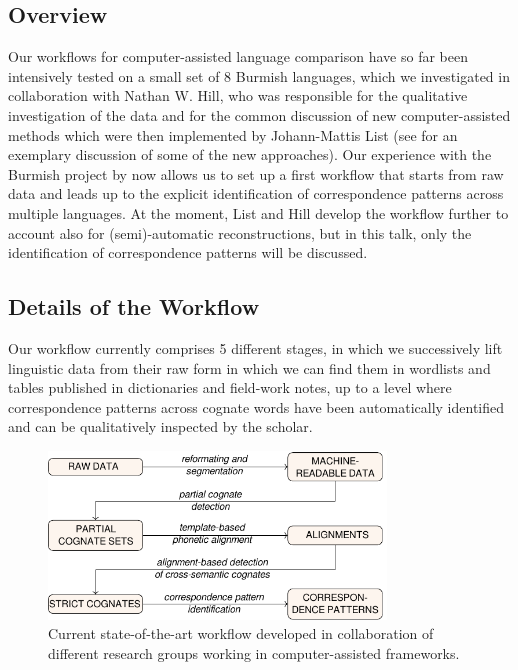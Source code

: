 \documentclass[xetex]{scrartcl}
\begin{document}
\subsection{Overview}
Our workflows for computer-assisted language comparison have so far been intensively tested on a
small set of 8 Burmish languages, which we investigated in collaboration with Nathan W. Hill, who
was responsible for the qualitative investigation of the data and for the common discussion of new
computer-assisted methods which were then implemented by Johann-Mattis List (see \citealt{Hill2017a}
for an exemplary discussion of some of the new approaches). Our experience with the
Burmish project by now allows us to set up a first workflow that starts from raw data and leads up
to the explicit identification of correspondence patterns across multiple languages. At the moment,
List and Hill develop the workflow further to account also for (semi)-automatic reconstructions, but
in this talk, only the identification of correspondence patterns will be discussed.

\subsection{Details of the Workflow}

Our workflow currently comprises 5 different stages, in which we successively lift linguistic data
from their raw form in which we can find them in wordlists and tables published in dictionaries and
field-work notes, up to a level where correspondence patterns across cognate words have been
automatically identified and can be qualitatively inspected by the scholar.

\begin{figure}[htb]
  \centering
  \includegraphics[width=0.8\textwidth]{calc-workflow.pdf}
  \caption{Current state-of-the-art workflow developed in collaboration of different research groups
  working in computer-assisted frameworks.}
  \label{fig:workflow}
\end{figure}
\end{document}
